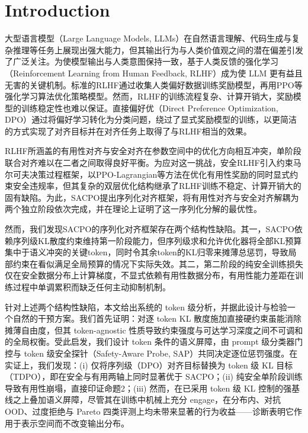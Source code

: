 \documentclass[lettersize,journal]{IEEEtran}
\begin{document}
\section{Introduction}
大型语言模型（Large Language Models, LLMs）在自然语言理解\cite{bubeck2023paper}、代码生成\cite{chen2021evaluating,gao2023pal}与复杂推理\cite{stiennon2020learning}等任务上展现出强大能力，但其输出行为与人类价值观之间的潜在偏差引发了广泛关注。为使模型输出与人类意图保持一致，基于人类反馈的强化学习（Reinforcement Learning from Human Feedback, RLHF）\cite{ouyang2022training}成为使 LLM 更有益且无害的关键机制。标准的RLHF通过收集人类偏好数据训练奖励模型，再用PPO\cite{schulman2017proximal}等强化学习算法优化策略模型。然而，RLHF的训练流程复杂、计算开销大，奖励模型的训练稳定性也难以保证。直接偏好优（Direct Preference Optimization, DPO）\cite{rafailov2023direct}通过将偏好学习转化为分类问题，绕过了显式奖励模型的训练，以更简洁的方式实现了对齐目标并在对齐任务上取得了与RLHF相当的效果。

RLHF所涵盖的有用性对齐与安全对齐在参数空间中的优化方向相互冲突\cite{bai2022training, ganguli2022red}，单阶段联合对齐难以在二者之间取得良好平衡。为应对这一挑战，安全RLHF\cite{dai2023safe}引入约束马尔可夫决策过程框架，以PPO-Lagrangian\cite{fujimoto2019benchmarking}等方法在优化有用性奖励的同时显式约束安全违规率，但其复杂的双层优化结构继承了RLHF训练不稳定、计算开销大的固有缺陷。为此，SACPO\cite{wachi2024stepwise}提出序列化对齐框架，将有用性对齐与安全对齐解耦为两个独立阶段依次完成，并在理论上证明了这一序列化分解的最优性。

然而，我们发现SACPO的序列化对齐框架存在两个结构性缺陷。其一，SACPO依赖序列级KL散度约束维持第一阶段能力，但序列级求和允许优化器将全部KL预算集中于语义冲突的关键token，同时令其余token的KL归零来摊薄总惩罚，导致局部约束在看似满足全局预算的情况下实际失效。其二，第二阶段的纯安全训练损失仅在安全数据分布上计算梯度，不显式依赖有用性数据分布，有用性能力差距在训练过程中单调累积而缺乏任何主动抑制机制。

针对上述两个结构性缺陷，本文给出系统的 token 级分析，并据此设计与检验一个自然的干预方案。我们首先证明：对逐 token KL 散度施加直接硬约束虽能消除摊薄自由度，但其 token-agnostic 性质导致约束强度与可达学习深度之间不可调和的全局权衡。受此启发，我们设计 token 条件的语义屏障，由 prompt 级分类器门控与 token 级安全探针（Safety-Aware Probe, SAP）共同决定逐位惩罚强度。在实证上，我们发现：(i) 仅将序列级（DPO）对齐目标替换为 token 级 KL 目标（TDPO），即在安全与有用两轴上同时显著优于 SACPO；(ii) 纯安全单阶段训练导致有用性崩塌，直接印证命题2；(iii) 然而，在已采用 token 级 KL 控制的强基线之上叠加语义屏障，尽管其在训练中机械上充分 engage，在分布内、对抗 OOD、过度拒绝与 Pareto 四类评测上均未带来显著的行为收益——诊断表明它作用于表示空间而不改变输出分布。
\end{document}
